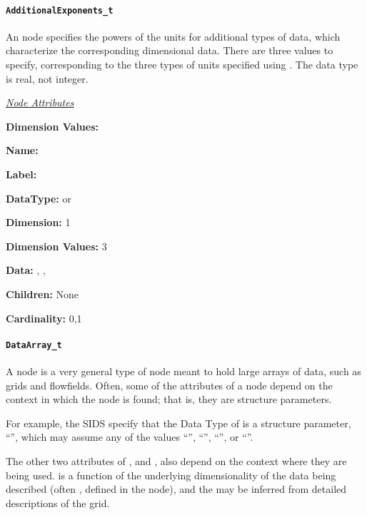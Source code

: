\paragraph{\texttt{AdditionalExponents\_t}}

An  node specifies the powers of the units
for additional types of data, which characterize the corresponding
dimensional data.
There are three values to specify, corresponding to the three types of
units specified using .
The data type is real, not integer.

\textit{\uline{Node Attributes}}
\begin{Ventryic}{\textbf{Dimension Values:}}
\raggedright
\item [\textbf{Name:}]
\item [\textbf{Label:}]
\item [\textbf{DataType:}]
       or 
\item [\textbf{Dimension:}]
      1
\item [\textbf{Dimension Values:}]
      3
\item [\textbf{Data:}]
      , ,
\item [\textbf{Children:}]
      None
\item [\textbf{Cardinality:}]
      0,1
\end{Ventryic}

\paragraph{\texttt{DataArray\_t}}

A  node is a very general type of node meant to hold
large arrays of data, such as grids and flowfields. Often, some of the
attributes of a  node depend on the context in which
the node is found; that is, they are structure parameters.

For example, the SIDS specify that the Data Type of 
is a structure parameter, ``'', which may assume
any of the values ``'', ``'',
``'', or ``''.

The other two attributes of , 
and , also depend on the context where they are being used.
 is a function of the underlying dimensionality of
the data being described (often , defined in the
 node), and the  may be inferred from
detailed descriptions of the grid.

